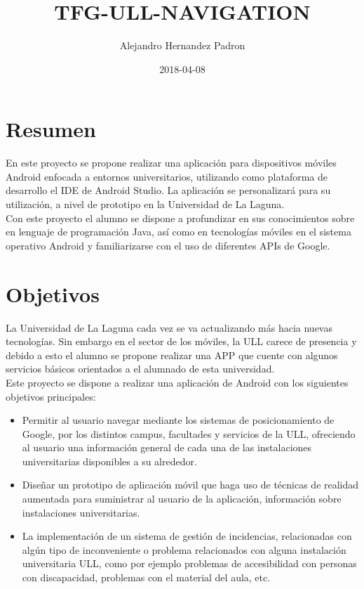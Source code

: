 \documentclass{article}
\title{TFG-ULL-NAVIGATION}
\date{2018-04-08}
\author{Alejandro Hernandez Padron}
\begin{document}
    \maketitle
    \newpage
    
    \section{Resumen}

    En este proyecto se propone realizar una aplicación para dispositivos móviles Android enfocada a entornos universitarios, utilizando como plataforma de desarrollo el IDE de Android Studio. La aplicación se personalizará para su utilización, a nivel de prototipo en la Universidad de La Laguna.\\

    Con este proyecto el alumno se dispone a profundizar en sus conocimientos sobre en lenguaje de programación Java, así como en tecnologías móviles en el sistema operativo Android y familiarizarse con el uso de diferentes APIs de Google.
    
    \newpage
    \section{Objetivos}
    La Universidad de La Laguna cada vez se va actualizando más hacia nuevas tecnologías. Sin embargo en el sector de los móviles, la ULL carece de presencia y debido a esto el alumno se propone realizar una APP que cuente con algunos servicios básicos orientados a el alumnado de esta universidad.\\

    Este proyecto se dispone a realizar una aplicación de Android con los siguientes objetivos principales:

    \begin{itemize}
        \item  	Permitir al usuario navegar mediante los sistemas de posicionamiento de Google, por los distintos campus, facultades y servicios de la ULL, ofreciendo al usuario una información general de cada una de las instalaciones universitarias disponibles a su alrededor.
        \item   Diseñar un prototipo de aplicación móvil que haga uso de técnicas de realidad aumentada para suministrar al usuario de la aplicación, información sobre instalaciones universitarias.
        \item   La implementación de un sistema de gestión de incidencias, relacionadas con algún tipo de inconveniente o problema relacionados con alguna instalación universitaria ULL, como por ejemplo problemas de accesibilidad con personas con discapacidad, problemas con el material del aula, etc.
    \end{itemize}
\end{document}
